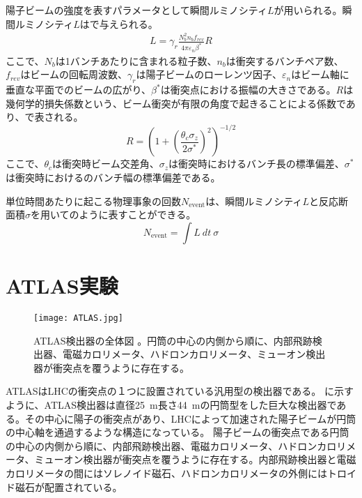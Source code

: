 陽子ビームの強度を表すパラメータとして瞬間ルミノシティ$L$が用いられる。瞬間ルミノシティ$L$はで与えられる。
\begin{align}
  \label{eq:lumi}
  L = \gamma_{r} \frac{N_{b}^{2} n_{b} f_{rev}}{4\pi \varepsilon_{n} \beta^*}R
\end{align}
ここで、$N_{b}$は1バンチあたりに含まれる粒子数、$n_{b}$は衝突するバンチペア数、$f_{rev}$はビームの回転周波数、$\gamma_{r}$は陽子ビームのローレンツ因子、$\varepsilon_{n}$はビーム軸に垂直な平面でのビームの広がり、$\beta^{*}$は衝突点における振幅の大きさである。$R$は幾何学的損失係数という、ビーム衝突が有限の角度で起きることによる係数であり、で表される。
\begin{equation}
  \label{eq:kikaf}
  R=\left( 1+\left( \frac{\theta_{c}\sigma_{z}}{2\sigma^{*}} \right)^2 \right)^{-1/2}
\end{equation}
ここで、$\theta_c$は衝突時ビーム交差角、$\sigma_z$は衝突時におけるバンチ長の標準偏差、$\sigma^*$は衝突時におけるのバンチ幅の標準偏差である。

単位時間あたりに起こる物理事象の回数$N_\mathrm{event}$は、瞬間ルミノシティ$L$と反応断面積$\sigma$を用いてのように表すことができる。
\begin{equation}
  \label{eq:hannnou}
  N_\mathrm{event} = \int L\ dt\ \sigma
\end{equation}


\section{ATLAS実験}
\label{sec:ATLAS}
\begin{figure}[tbp]
  \centering
  \texttt{[image: ATLAS.jpg]}
  \caption[ATLAS検出器の全体図]{ATLAS検出器の全体図 \cite{ATLAS}。円筒の中心の内側から順に、内部飛跡検出器、電磁カロリメータ、ハドロンカロリメータ、ミューオン検出器が衝突点を覆うように存在する。}
  \label{fig:ATLAS}
\end{figure}

ATLASはLHCの衝突点の１つに設置されている汎用型の検出器である。 に示すように、ATLAS検出器は直径25\ \si{m}長さ44\ \si{m}の円筒型をした巨大な検出器である。その中心に陽子の衝突点があり、LHCによって加速された陽子ビームが円筒の中心軸を通過するような構造になっている。
陽子ビームの衝突点である円筒の中心の内側から順に、内部飛跡検出器、電磁カロリメータ、ハドロンカロリメータ、ミューオン検出器が衝突点を覆うように存在する。内部飛跡検出器と電磁カロリメータの間にはソレノイド磁石、ハドロンカロリメータの外側にはトロイド磁石が配置されている。


